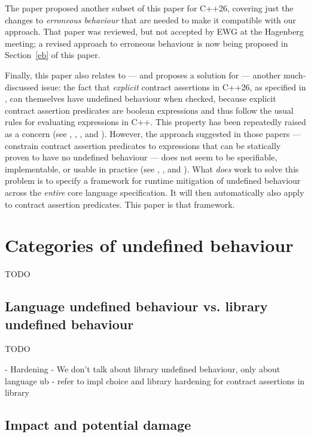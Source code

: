 The paper \cite{P3229R0} proposed another subset of this paper for C++26, covering just the changes to \emph{erroneous behaviour} that are needed to make it compatible with our approach. That paper was reviewed, but not accepted by EWG at the Hagenberg meeting; a revised approach to erroneous behaviour is now being proposed in Section~\ref{eb} of this paper.

Finally, this paper also relates to --- and proposes a solution for --- another much-discussed issue: the fact that \emph{explicit} contract assertions in C++26, as specified in \cite{P2900R14}, can themselves have undefined behaviour when checked, because explicit contract assertion predicates are boolean expressions and thus follow the usual rules for evaluating expressions in C++. This property has been repeatedly raised as a concern (see \cite{P2680R1}, \cite{P3173R0}, \cite{P3285R0}, and \cite{P3362R0}). However, the approach suggested in those papers --- constrain contract assertion predicates to expressions that can be statically proven to have no undefined behaviour --- does not seem to be specifiable, implementable, or usable in practice (see  \cite{P3376R0}, \cite{P3386R0}, and \cite{P3499R1}). What \emph{does} work to solve this problem is to specify a framework for runtime mitigation of undefined behaviour across the \emph{entire} core language specification. It will then automatically also apply to contract assertion predicates. This paper is that framework.

\section{Categories of undefined behaviour}
\label{categoriesofub}


TODO

\subsection{Language undefined behaviour vs. library undefined behaviour}

TODO


- Hardening
  - We don't talk about library undefined behaviour, only about language ub
  - refer to impl choice and library hardening for contract assertions in library

\subsection{Impact and potential damage}

